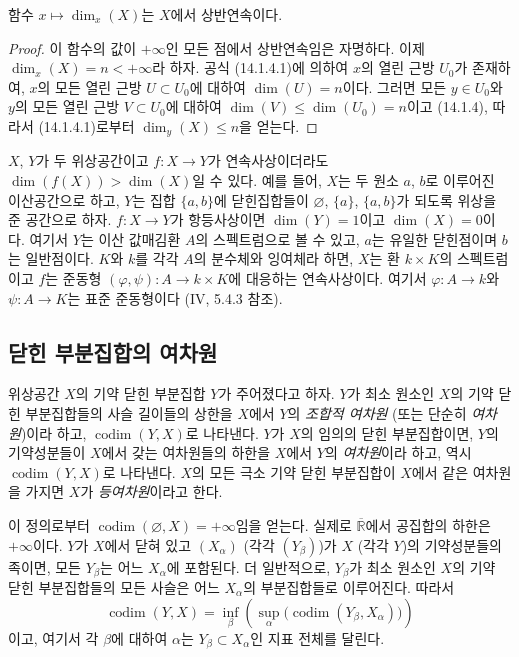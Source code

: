 \begin{proposition}[14.1.11]
\label{0.14.1.11-fr}
함수 $x\mapsto\dim_x(X)$는 $X$에서 상반연속이다.
\end{proposition}

\begin{proof}
이 함수의 값이 $+\infty$인 모든 점에서 상반연속임은 자명하다. 이제
$\dim_x(X)=n<+\infty$라 하자. 공식 (14.1.4.1)에 의하여 $x$의 열린
근방 $U_0$가 존재하여, $x$의 모든 열린 근방 $U\subset U_0$에 대하여
$\dim(U)=n$이다. 그러면 모든 $y\in U_0$와 $y$의 모든 열린 근방
$V\subset U_0$에 대하여
$\dim(V)\leq\dim(U_0)=n$이고 (14.1.4), 따라서 (14.1.4.1)로부터
$\dim_y(X)\leq n$을 얻는다.
\end{proof}

\begin{remark}[14.1.12]
\label{0.14.1.12-fr}
$X$, $Y$가 두 위상공간이고 $f:X\to Y$가 연속사상이더라도
$\dim(f(X))>\dim(X)$일 수 있다. 예를 들어, $X$는 두 원소 $a$, $b$로
이루어진 이산공간으로 하고, $Y$는 집합 $\{a,b\}$에 닫힌집합들이
$\varnothing$, $\{a\}$, $\{a,b\}$가 되도록 위상을 준 공간으로 하자.
$f:X\to Y$가 항등사상이면 $\dim(Y)=1$이고 $\dim(X)=0$이다. 여기서
$Y$는 이산 값매김환 $A$의 스펙트럼으로 볼 수 있고, $a$는 유일한
닫힌점이며 $b$는 일반점이다. $K$와 $k$를 각각 $A$의 분수체와
잉여체라 하면, $X$는 환 $k\times K$의 스펙트럼이고 $f$는 준동형
$(\varphi,\psi):A\to k\times K$에 대응하는 연속사상이다. 여기서
$\varphi:A\to k$와 $\psi:A\to K$는 표준 준동형이다 (IV, 5.4.3 참조).
\end{remark}

\subsection{닫힌 부분집합의 여차원}
\label{subsection:0.14.2-fr}

\begin{definition}[14.2.1]
\label{0.14.2.1-fr}
위상공간 $X$의 기약 닫힌 부분집합 $Y$가 주어졌다고 하자. $Y$가
최소 원소인 $X$의 기약 닫힌 부분집합들의 사슬 길이들의 상한을
$X$에서 $Y$의 \emph{조합적 여차원} (또는 단순히 \emph{여차원})이라
하고, $\operatorname{codim}(Y,X)$로 나타낸다. $Y$가 $X$의 임의의
닫힌 부분집합이면, $Y$의 기약성분들이 $X$에서 갖는 여차원들의 하한을
$X$에서 $Y$의 \emph{여차원}이라 하고, 역시
$\operatorname{codim}(Y,X)$로 나타낸다. $X$의 모든 극소 기약 닫힌
부분집합이 $X$에서 같은 여차원을 가지면 $X$가 \emph{등여차원}이라고
한다.
\end{definition}

이 정의로부터 $\operatorname{codim}(\varnothing,X)=+\infty$임을
얻는다. 실제로 $\overline{\mathbb R}$에서 공집합의 하한은
$+\infty$이다. $Y$가 $X$에서 닫혀 있고 $(X_\alpha)$ (각각
$(Y_\beta)$)가 $X$ (각각 $Y$)의 기약성분들의 족이면, 모든
$Y_\beta$는 어느 $X_\alpha$에 포함된다. 더 일반적으로,
$Y_\beta$가 최소 원소인 $X$의 기약 닫힌 부분집합들의 모든 사슬은
어느 $X_\alpha$의 부분집합들로 이루어진다. 따라서
\[
  \operatorname{codim}(Y,X)=
  \inf_\beta\left(\sup_\alpha
  \bigl(\operatorname{codim}(Y_\beta,X_\alpha)\bigr)\right)
  \tag{14.2.1.1}\label{0.14.2.1.1-fr}
\]
이고, 여기서 각 $\beta$에 대하여 $\alpha$는
$Y_\beta\subset X_\alpha$인 지표 전체를 달린다.

